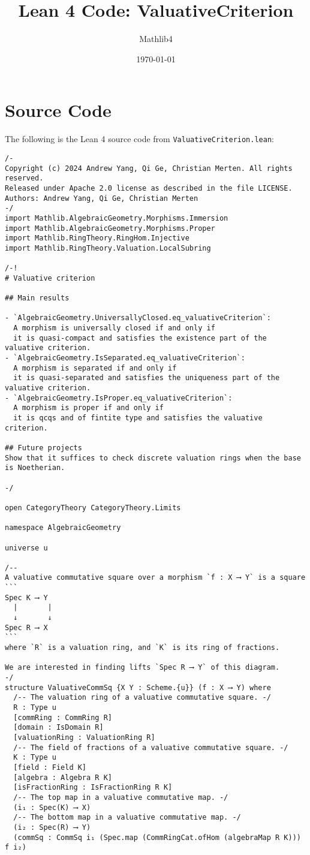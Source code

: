 \documentclass{article}
\title{Lean 4 Code: ValuativeCriterion}
\author{Mathlib4}
\date{\today}
\begin{document}
\maketitle

\section{Source Code}

The following is the Lean 4 source code from \texttt{ValuativeCriterion.lean}:

\begin{lstlisting}[language=Lean, caption={ValuativeCriterion.lean}]
/-
Copyright (c) 2024 Andrew Yang, Qi Ge, Christian Merten. All rights reserved.
Released under Apache 2.0 license as described in the file LICENSE.
Authors: Andrew Yang, Qi Ge, Christian Merten
-/
import Mathlib.AlgebraicGeometry.Morphisms.Immersion
import Mathlib.AlgebraicGeometry.Morphisms.Proper
import Mathlib.RingTheory.RingHom.Injective
import Mathlib.RingTheory.Valuation.LocalSubring

/-!
# Valuative criterion

## Main results

- `AlgebraicGeometry.UniversallyClosed.eq_valuativeCriterion`:
  A morphism is universally closed if and only if
  it is quasi-compact and satisfies the existence part of the valuative criterion.
- `AlgebraicGeometry.IsSeparated.eq_valuativeCriterion`:
  A morphism is separated if and only if
  it is quasi-separated and satisfies the uniqueness part of the valuative criterion.
- `AlgebraicGeometry.IsProper.eq_valuativeCriterion`:
  A morphism is proper if and only if
  it is qcqs and of fintite type and satisfies the valuative criterion.

## Future projects
Show that it suffices to check discrete valuation rings when the base is Noetherian.

-/

open CategoryTheory CategoryTheory.Limits

namespace AlgebraicGeometry

universe u

/--
A valuative commutative square over a morphism `f : X ⟶ Y` is a square
```
Spec K ⟶ Y
  |       |
  ↓       ↓
Spec R ⟶ X
```
where `R` is a valuation ring, and `K` is its ring of fractions.

We are interested in finding lifts `Spec R ⟶ Y` of this diagram.
-/
structure ValuativeCommSq {X Y : Scheme.{u}} (f : X ⟶ Y) where
  /-- The valuation ring of a valuative commutative square. -/
  R : Type u
  [commRing : CommRing R]
  [domain : IsDomain R]
  [valuationRing : ValuationRing R]
  /-- The field of fractions of a valuative commutative square. -/
  K : Type u
  [field : Field K]
  [algebra : Algebra R K]
  [isFractionRing : IsFractionRing R K]
  /-- The top map in a valuative commutative map. -/
  (i₁ : Spec(K) ⟶ X)
  /-- The bottom map in a valuative commutative map. -/
  (i₂ : Spec(R) ⟶ Y)
  (commSq : CommSq i₁ (Spec.map (CommRingCat.ofHom (algebraMap R K))) f i₂)


\end{lstlisting}
\end{document}
